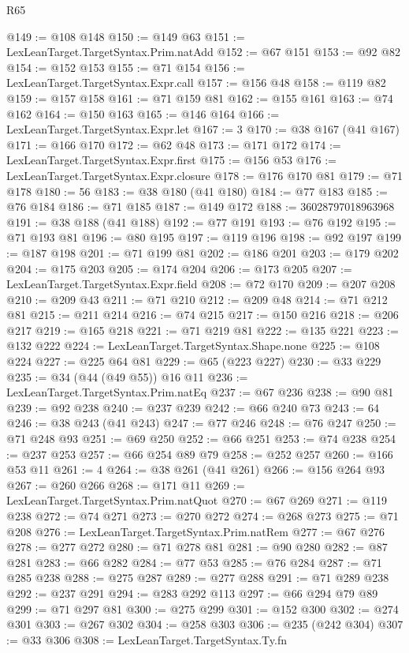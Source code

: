 \begin{lexlean}{R65}
\begin{coremodule}
@149 := @108 @148
@150 := @149 @63
@151 := LexLeanTarget.TargetSyntax.Prim.natAdd
@152 := @67 @151
@153 := @92 @82
@154 := @152 @153
@155 := @71 @154
@156 := LexLeanTarget.TargetSyntax.Expr.call
@157 := @156 @48
@158 := @119 @82
@159 := @157 @158
@161 := @71 @159 @81
@162 := @155 @161
@163 := @74 @162
@164 := @150 @163
@165 := @146 @164
@166 := LexLeanTarget.TargetSyntax.Expr.let
@167 := 3
@170 := @38 @167 (@41 @167)
@171 := @166 @170
@172 := @62 @48
@173 := @171 @172
@174 := LexLeanTarget.TargetSyntax.Expr.first
@175 := @156 @53
@176 := LexLeanTarget.TargetSyntax.Expr.closure
@178 := @176 @170 @81
@179 := @71 @178
@180 := 56
@183 := @38 @180 (@41 @180)
@184 := @77 @183
@185 := @76 @184
@186 := @71 @185
@187 := @149 @172
@188 := 36028797018963968
@191 := @38 @188 (@41 @188)
@192 := @77 @191
@193 := @76 @192
@195 := @71 @193 @81
@196 := @80 @195
@197 := @119 @196
@198 := @92 @197
@199 := @187 @198
@201 := @71 @199 @81
@202 := @186 @201
@203 := @179 @202
@204 := @175 @203
@205 := @174 @204
@206 := @173 @205
@207 := LexLeanTarget.TargetSyntax.Expr.field
@208 := @72 @170
@209 := @207 @208
@210 := @209 @43
@211 := @71 @210
@212 := @209 @48
@214 := @71 @212 @81
@215 := @211 @214
@216 := @74 @215
@217 := @150 @216
@218 := @206 @217
@219 := @165 @218
@221 := @71 @219 @81
@222 := @135 @221
@223 := @132 @222
@224 := LexLeanTarget.TargetSyntax.Shape.none
@225 := @108 @224
@227 := @225 @64 @81
@229 := @65 (@223 @227)
@230 := @33 @229
@235 := @34 (@44 (@49 @55)) @16 @11
@236 := LexLeanTarget.TargetSyntax.Prim.natEq
@237 := @67 @236
@238 := @90 @81
@239 := @92 @238
@240 := @237 @239
@242 := @66 @240 @73
@243 := 64
@246 := @38 @243 (@41 @243)
@247 := @77 @246
@248 := @76 @247
@250 := @71 @248 @93
@251 := @69 @250
@252 := @66 @251
@253 := @74 @238
@254 := @237 @253
@257 := @66 @254 @89 @79
@258 := @252 @257
@260 := @166 @53 @11
@261 := 4
@264 := @38 @261 (@41 @261)
@266 := @156 @264 @93
@267 := @260 @266
@268 := @171 @11
@269 := LexLeanTarget.TargetSyntax.Prim.natQuot
@270 := @67 @269
@271 := @119 @238
@272 := @74 @271
@273 := @270 @272
@274 := @268 @273
@275 := @71 @208
@276 := LexLeanTarget.TargetSyntax.Prim.natRem
@277 := @67 @276
@278 := @277 @272
@280 := @71 @278 @81
@281 := @90 @280
@282 := @87 @281
@283 := @66 @282
@284 := @77 @53
@285 := @76 @284
@287 := @71 @285 @238
@288 := @275 @287
@289 := @277 @288
@291 := @71 @289 @238
@292 := @237 @291
@294 := @283 @292 @113
@297 := @66 @294 @79 @89
@299 := @71 @297 @81
@300 := @275 @299
@301 := @152 @300
@302 := @274 @301
@303 := @267 @302
@304 := @258 @303
@306 := @235 (@242 @304)
@307 := @33 @306
@308 := LexLeanTarget.TargetSyntax.Ty.fn

\end{coremodule}
\end{lexlean}
